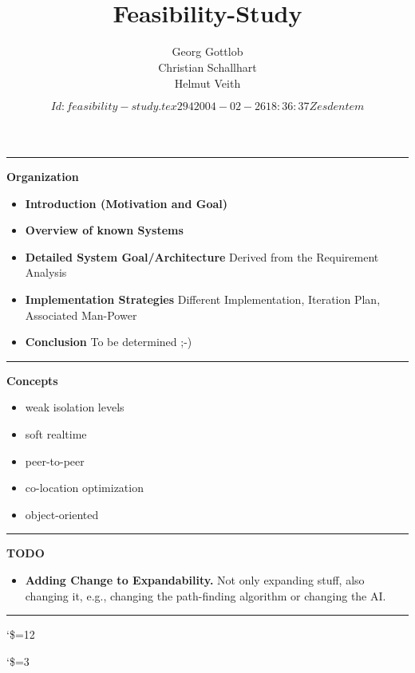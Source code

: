 \documentclass[a4paper, 10pt]{book}
\begin{document}
\begin{titlepage}


    \hrule\smallskip

    \textbf{Organization}

    \begin{itemize}
        \item \textbf{Introduction (Motivation and Goal)}
        \item \textbf{Overview of known Systems}
        \item \textbf{Detailed System Goal/Architecture} Derived from
            the Requirement Analysis
        \item \textbf{Implementation Strategies} Different Implementation,
            Iteration Plan, Associated Man-Power
        \item \textbf{Conclusion} To be determined ;-)
    \end{itemize}

    \hrule\smallskip

    \textbf{Concepts}

    \begin{itemize}
        \item weak isolation levels
        \item soft realtime
        \item peer-to-peer
        \item co-location optimization
        \item object-oriented
    \end{itemize}

    \hrule\smallskip

    \textbf{TODO}

    \begin{itemize}
        \item \textbf{Adding Change to Expandability.} Not only expanding
            stuff, also changing it, e.g., changing the path-finding algorithm
            or changing the AI. 
    \end{itemize}

    \hrule

\end{titlepage}

\title{\SYNEIGHTLOGO\\\vspace{1cm}Feasibility-Study}
\author{Georg Gottlob\\ Christian Schallhart\\ Helmut Veith}
\catcode`\$=12
\date{\texttt{$Id: feasibility-study.tex 294 2004-02-26 18:36:37Z
esdentem $}}
\catcode`\$=3
\maketitle
\end{document}
